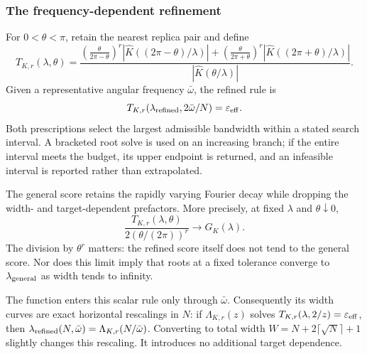 \subsubsection{The frequency-dependent refinement}
\label{app:bw-refined-rule}

For $0<\theta<\pi$, retain the nearest replica pair and define
\begin{equation}
 T_{K,r}(\lambda,\theta)=
 \frac{
 \left(\frac{\theta}{2\pi-\theta}\right)^r
   |\widehat K((2\pi-\theta)/\lambda)|
 +\left(\frac{\theta}{2\pi+\theta}\right)^r
   |\widehat K((2\pi+\theta)/\lambda)|}
 {|\widehat K(\theta/\lambda)|}.
 \label{eq:bw-first-pair}
\end{equation}
Given a representative angular frequency $\bar\omega$, the refined rule is
\begin{equation}
 T_{K,r}(\lambda_{\rm refined},2\bar\omega/N)
 =\varepsilon_{\rm eff}.
 \label{eq:bw-refined-root}
\end{equation}
Both prescriptions select the largest admissible bandwidth within a stated
search interval. A bracketed root solve is used on an increasing branch;
if the entire interval meets the budget, its upper endpoint is returned,
and an infeasible interval is reported rather than extrapolated.

The general score retains the rapidly varying Fourier decay while dropping
the width- and target-dependent prefactors. More precisely, at fixed
$\lambda$ and $\theta\downarrow0$,
\begin{equation}
 \frac{T_{K,r}(\lambda,\theta)}{2(\theta/(2\pi))^r}
 \longrightarrow G_K(\lambda).
 \label{eq:bw-general-refined-limit}
\end{equation}
The division by $\theta^r$ matters: the refined score itself does not tend
to the general score. Nor does this limit imply that roots at a fixed
tolerance converge to $\lambda_{\rm general}$ as width tends to infinity.

The function enters this scalar rule only through $\bar\omega$.
Consequently its width curves are exact horizontal rescalings in $N$:
if $\Lambda_{K,r}(z)$ solves $T_{K,r}(\lambda,2/z)=\varepsilon_{\rm eff}$,
then $\lambda_{\rm refined}(N,\bar\omega)=\Lambda_{K,r}(N/\bar\omega)$.
Converting to total width $W=N+2\lceil\sqrt N\rceil+1$ slightly changes this
rescaling. It introduces no additional target dependence.

